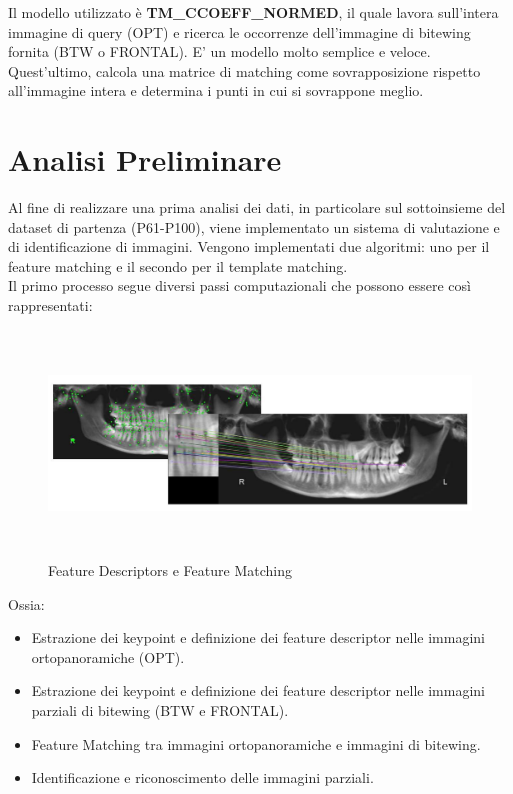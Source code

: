 \documentclass[12pt,a4paper,openright,twoside]{book}
\begin{document}
Il modello utilizzato è  \textbf{TM\_CCOEFF\_NORMED}, il quale lavora sull'intera immagine di query (OPT) e ricerca le occorrenze dell'immagine di bitewing fornita (BTW o FRONTAL). E' un modello molto semplice e veloce.\\
Quest'ultimo, calcola una matrice di matching come sovrapposizione rispetto all'immagine intera e determina i punti in cui si sovrappone meglio.

\chapter{Analisi Preliminare}
Al fine di realizzare una prima analisi dei dati, in particolare sul sottoinsieme del dataset di partenza (P61-P100), viene implementato un sistema di valutazione e di identificazione di immagini. Vengono implementati due algoritmi: uno per il feature matching e il secondo per il template matching.\\
Il primo processo segue diversi passi computazionali che possono essere così rappresentati:
\begin{figure}[H]
	\centering
	\includegraphics[height=6cm,width=16cm]{figures/keypoint.pdf}
    	\caption{Feature Descriptors e Feature Matching}
	\label{fig:keypointdescriptor}
\end{figure}
Ossia:
\begin{itemize}
\item Estrazione dei keypoint e definizione dei feature descriptor nelle immagini ortopanoramiche (OPT).
\item Estrazione dei keypoint e definizione dei feature descriptor nelle immagini parziali di bitewing (BTW e FRONTAL).
\item Feature Matching tra immagini ortopanoramiche e immagini di bitewing.
\item Identificazione e riconoscimento delle immagini parziali.
\end{itemize}
\end{document}
